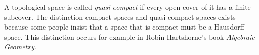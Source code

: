 \documentclass[12pt]{article}
\begin{document}
A topological space is called {\em quasi-compact} if every open cover of it has a finite subcover.  The distinction  compact spaces and quasi-compact spaces exists because some people insist that a space that is compact must be a Hausdorff space.  This distinction occurs for example in Robin Hartshorne's book {\sl Algebraic Geometry\/}.
\end{document}
